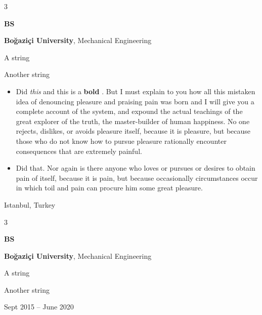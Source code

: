 \documentclass[10pt, letterpaper]{article}
\newenvironment{summary}{
    \begin{description}[
        topsep=0.10 cm,
        parsep=0.10 cm,
        partopsep=0pt,
        itemsep=0pt,
        leftmargin=0.4 cm + 10pt
    ]
}{
    \end{description}
} %
\newenvironment{highlights}{
    \begin{itemize}[
        topsep=0.10 cm,
        parsep=0.10 cm,
        partopsep=0pt,
        itemsep=0pt,
        leftmargin=0.4 cm + 10pt
    ]
}{
    \end{itemize}
} %
\newenvironment{threecolentry}[3][]{
    \onecolentry
    \def\thirdColumn{#3}
    \setcolumnwidth{1 cm, \fill, 4.5 cm}
    \begin{paracol}{3}
    {\raggedright #2} \switchcolumn
}{
    \switchcolumn \raggedleft \thirdColumn
    \end{paracol}
    \endonecolentry
} %
\let\hrefWithoutArrow\href
\renewcommand{\href}[2]{\hrefWithoutArrow{#1}{\ifthenelse{\equal{#2}{}}{ }{#2 }\raisebox{.15ex}{\footnotesize \faExternalLink*}}}
\begin{document}
        \begin{threecolentry}{\textbf{BS}}{
            Istanbul, Turkey
        }
            \textbf{Boğaziçi University}, Mechanical Engineering
            \begin{summary}
                \item A string
                \item Another string
            \end{summary}
            \begin{highlights}
                \item Did \textit{this} and this is a \textbf{bold} \href{https://example.com}{link}. But I must explain to you how all this mistaken idea of denouncing pleasure and praising pain was born and I will give you a complete account of the system, and expound the actual teachings of the great explorer of the truth, the master-builder of human happiness. No one rejects, dislikes, or avoids pleasure itself, because it is pleasure, but because those who do not know how to pursue pleasure rationally encounter consequences that are extremely painful.
                \item Did that. Nor again is there anyone who loves or pursues or desires to obtain pain of itself, because it is pain, but because occasionally circumstances occur in which toil and pain can procure him some great pleasure.
            \end{highlights}
        \end{threecolentry}

        \vspace{0.2 cm}

        \begin{threecolentry}{\textbf{BS}}{
            Sept 2015 – June 2020
        }
            \textbf{Boğaziçi University}, Mechanical Engineering
            \begin{summary}
                \item A string
                \item Another string
            \end{summary}
        \end{threecolentry}

        \vspace{0.2 cm}
\end{document}
